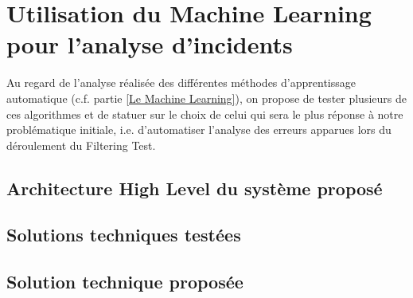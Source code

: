 \chapter{Utilisation du Machine Learning pour l'analyse d'incidents}
\label{Utilisation du Machine Learning pour l'analyse d'incidents}
\thispagestyle{fancy}

Au regard de l'analyse réalisée des différentes méthodes d'apprentissage automatique (c.f. partie \ref{Le Machine Learning}), on propose de tester plusieurs de ces algorithmes et de statuer sur le choix de celui qui sera le plus réponse à notre problématique initiale, i.e. d'automatiser l'analyse des erreurs apparues lors du déroulement du Filtering Test.

\section{Architecture High Level du système proposé}
\label{Utilisation du Machine Learning pour l'analyse d'incidents: Achitecture High Level du système proposé}

\section{Solutions techniques testées}
\label{Utilisation du Machine Learning pour l'analyse d'incidents: Solutions techniques testées}

\section{Solution technique proposée}
\label{Utilisation du Machine Learning pour l'analyse d'incidents: Solution technique proposée}

